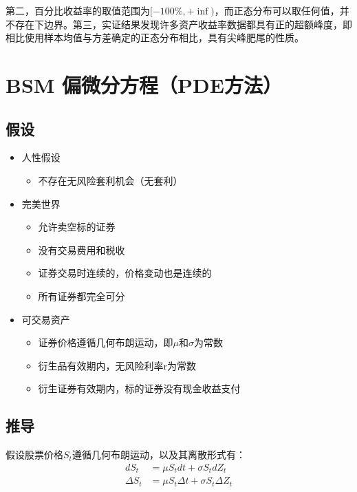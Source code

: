 \documentclass[11pt]{article}
\begin{document}
第二，百分比收益率的取值范围为$[-100\%,+\inf)$，而正态分布可以取任何值，并不存在下边界。第三，实证结果发现许多资产收益率数据都具有正的超额峰度，即相比使用样本均值与方差确定的正态分布相比，具有尖峰肥尾的性质。

\section{BSM 偏微分方程（PDE方法）}

\subsection{假设}
\begin{itemize}
    \item 人性假设
    \begin{itemize}[leftmargin=2em]
        \item 不存在无风险套利机会（无套利）
    \end{itemize}
    \item 完美世界
    \begin{itemize}
        \item 允许卖空标的证券
        \item 没有交易费用和税收
        \item 证券交易时连续的，价格变动也是连续的
        \item 所有证券都完全可分
    \end{itemize}
    \item 可交易资产
        \begin{itemize}
            \item 证券价格遵循几何布朗运动，即$\mu$和$\sigma$为常数
            \item 衍生品有效期内，无风险利率r为常数
            \item 衍生证券有效期内，标的证券没有现金收益支付
        \end{itemize}
\end{itemize}

\subsection{推导}

假设股票价格$S_t$遵循几何布朗运动，以及其离散形式有：
\begin{align*}
    d S_t & = \mu S_t dt + \sigma S_t d Z_t \\
    \Delta S_t & = \mu S_t \Delta t + \sigma S_t \Delta Z_t
\end{align*}
\end{document}
